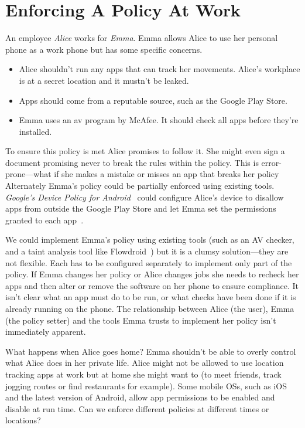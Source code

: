 \documentclass[]{llncs}
\begin{document}
\section{Enforcing A Policy At Work}
\label{sec:problem}

An employee \emph{Alice} works for \emph{Emma}.
Emma allows Alice to use her personal phone as a work phone but has some specific concerns.
\begin{itemize}
  \item Alice shouldn't run any apps that can track her movements.
    Alice's workplace is at a secret location and it mustn't be leaked.
  \item Apps should come from a reputable source, such as the Google Play Store.
  \item Emma uses an \ac{av} program by McAfee.
    It should check all apps before they're installed.
\end{itemize}

To ensure this policy is met Alice promises to follow it.
She might even sign a document promising never to break the rules within the policy.
This is error-prone---what if she makes a mistake or misses an app that breaks her policy
Alternately Emma's policy could be partially enforced using existing tools.
\emph{Google's Device Policy for Android}~\cite{GoogleAppsDeviceP:tz} could configure Alice's device to disallow apps from outside the Google Play Store and let Emma set the permissions granted to each app~\cite{AndroidMPermission:2015uq}.

We could implement Emma's policy using existing tools (such as an AV checker, and a taint analysis tool like Flowdroid~\cite{Fritz:2013vi}) but it is a clumsy solution---they are not flexible.
Each has to be configured separately to implement only part of the policy.
If Emma changes her policy or Alice changes jobs she needs to recheck her apps and then alter or remove the software on her phone to ensure compliance.
It isn't clear what an app must do to be run, or what checks have been done if it is already running on the phone.
The relationship between Alice (the user), Emma (the policy setter) and the tools Emma trusts to implement her policy isn't immediately apparent.

What happens when Alice goes home?
Emma shouldn't be able to overly control what Alice does in her private life.
Alice might not be allowed to use location tracking apps at work but at home she might want to (to meet friends, track jogging routes or find restaurants for example).
Some mobile OSs, such as iOS and the latest version of Android, allow app permissions to be enabled and disable at run time.
Can we enforce different policies at different times or locations?
\end{document}
